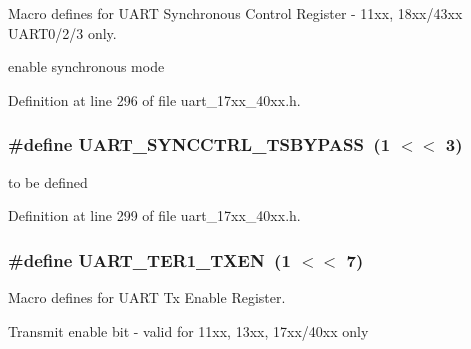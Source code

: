 Macro defines for U\+A\+RT Synchronous Control Register -\/ 11xx, 18xx/43xx U\+A\+R\+T0/2/3 only. 

enable synchronous mode 

Definition at line 296 of file uart\+\_\+17xx\+\_\+40xx.\+h.

\subsubsection[{\texorpdfstring{U\+A\+R\+T\+\_\+\+S\+Y\+N\+C\+C\+T\+R\+L\+\_\+\+T\+S\+B\+Y\+P\+A\+SS}{UART_SYNCCTRL_TSBYPASS}}]{\setlength{\rightskip}{0pt plus 5cm}\#define U\+A\+R\+T\+\_\+\+S\+Y\+N\+C\+C\+T\+R\+L\+\_\+\+T\+S\+B\+Y\+P\+A\+SS~(1 $<$$<$ 3)}\hypertarget{group__UART__17XX__40XX_gaea12c85ea0d6a9fa91242904c707a285}{}\label{group__UART__17XX__40XX_gaea12c85ea0d6a9fa91242904c707a285}
to be defined 

Definition at line 299 of file uart\+\_\+17xx\+\_\+40xx.\+h.

\subsubsection[{\texorpdfstring{U\+A\+R\+T\+\_\+\+T\+E\+R1\+\_\+\+T\+X\+EN}{UART_TER1_TXEN}}]{\setlength{\rightskip}{0pt plus 5cm}\#define U\+A\+R\+T\+\_\+\+T\+E\+R1\+\_\+\+T\+X\+EN~(1 $<$$<$ 7)}\hypertarget{group__UART__17XX__40XX_ga78f0ee43aa0e7c030a3cfa1dca5ff072}{}\label{group__UART__17XX__40XX_ga78f0ee43aa0e7c030a3cfa1dca5ff072}


Macro defines for U\+A\+RT Tx Enable Register. 

Transmit enable bit -\/ valid for 11xx, 13xx, 17xx/40xx only 


